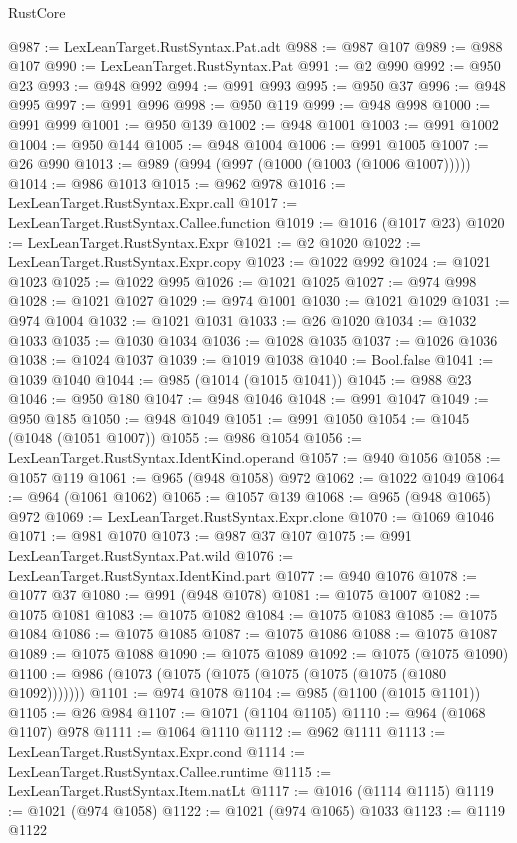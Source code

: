 \begin{lexlean}{RustCore}
\begin{coremodule}
@987 := LexLeanTarget.RustSyntax.Pat.adt
@988 := @987 @107
@989 := @988 @107
@990 := LexLeanTarget.RustSyntax.Pat
@991 := @2 @990
@992 := @950 @23
@993 := @948 @992
@994 := @991 @993
@995 := @950 @37
@996 := @948 @995
@997 := @991 @996
@998 := @950 @119
@999 := @948 @998
@1000 := @991 @999
@1001 := @950 @139
@1002 := @948 @1001
@1003 := @991 @1002
@1004 := @950 @144
@1005 := @948 @1004
@1006 := @991 @1005
@1007 := @26 @990
@1013 := @989 (@994 (@997 (@1000 (@1003 (@1006 @1007)))))
@1014 := @986 @1013
@1015 := @962 @978
@1016 := LexLeanTarget.RustSyntax.Expr.call
@1017 := LexLeanTarget.RustSyntax.Callee.function
@1019 := @1016 (@1017 @23)
@1020 := LexLeanTarget.RustSyntax.Expr
@1021 := @2 @1020
@1022 := LexLeanTarget.RustSyntax.Expr.copy
@1023 := @1022 @992
@1024 := @1021 @1023
@1025 := @1022 @995
@1026 := @1021 @1025
@1027 := @974 @998
@1028 := @1021 @1027
@1029 := @974 @1001
@1030 := @1021 @1029
@1031 := @974 @1004
@1032 := @1021 @1031
@1033 := @26 @1020
@1034 := @1032 @1033
@1035 := @1030 @1034
@1036 := @1028 @1035
@1037 := @1026 @1036
@1038 := @1024 @1037
@1039 := @1019 @1038
@1040 := Bool.false
@1041 := @1039 @1040
@1044 := @985 (@1014 (@1015 @1041))
@1045 := @988 @23
@1046 := @950 @180
@1047 := @948 @1046
@1048 := @991 @1047
@1049 := @950 @185
@1050 := @948 @1049
@1051 := @991 @1050
@1054 := @1045 (@1048 (@1051 @1007))
@1055 := @986 @1054
@1056 := LexLeanTarget.RustSyntax.IdentKind.operand
@1057 := @940 @1056
@1058 := @1057 @119
@1061 := @965 (@948 @1058) @972
@1062 := @1022 @1049
@1064 := @964 (@1061 @1062)
@1065 := @1057 @139
@1068 := @965 (@948 @1065) @972
@1069 := LexLeanTarget.RustSyntax.Expr.clone
@1070 := @1069 @1046
@1071 := @981 @1070
@1073 := @987 @37 @107
@1075 := @991 LexLeanTarget.RustSyntax.Pat.wild
@1076 := LexLeanTarget.RustSyntax.IdentKind.part
@1077 := @940 @1076
@1078 := @1077 @37
@1080 := @991 (@948 @1078)
@1081 := @1075 @1007
@1082 := @1075 @1081
@1083 := @1075 @1082
@1084 := @1075 @1083
@1085 := @1075 @1084
@1086 := @1075 @1085
@1087 := @1075 @1086
@1088 := @1075 @1087
@1089 := @1075 @1088
@1090 := @1075 @1089
@1092 := @1075 (@1075 @1090)
@1100 := @986 (@1073 (@1075 (@1075 (@1075 (@1075 (@1075 (@1080 @1092)))))))
@1101 := @974 @1078
@1104 := @985 (@1100 (@1015 @1101))
@1105 := @26 @984
@1107 := @1071 (@1104 @1105)
@1110 := @964 (@1068 @1107) @978
@1111 := @1064 @1110
@1112 := @962 @1111
@1113 := LexLeanTarget.RustSyntax.Expr.cond
@1114 := LexLeanTarget.RustSyntax.Callee.runtime
@1115 := LexLeanTarget.RustSyntax.Item.natLt
@1117 := @1016 (@1114 @1115)
@1119 := @1021 (@974 @1058)
@1122 := @1021 (@974 @1065) @1033
@1123 := @1119 @1122

\end{coremodule}
\end{lexlean}
